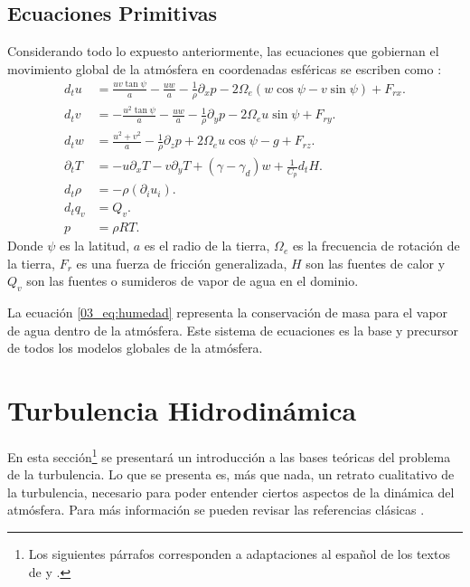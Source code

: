 \subsection{Ecuaciones Primitivas}
Considerando todo lo expuesto anteriormente, las ecuaciones que gobiernan el movimiento global de la atmósfera en coordenadas esféricas se escriben como \citep{warner2010numerical}:
\begin{align}
d_t u &= \frac{uv\tan\psi}{a}-\frac{uw}{a}-\frac{1}{\rho}\partial_x p - 2\Omega_e(w\cos\psi - v\sin\psi) + F_{rx}.\\
d_t v &= -\frac{u^2\tan\psi}{a}-\frac{uw}{a}-\frac{1}{\rho}\partial_y p - 2\Omega_e u\sin\psi + F_{ry}.\\
d_t w &= \frac{u^2 + v^2}{a}-\frac{1}{\rho}\partial_z p + 2\Omega_e u\cos\psi -g + F_{rz}.\\
\partial_t T &= -u\partial_x T -v\partial_y T + (\gamma-\gamma_d)w+\frac{1}{C_p}d_t H.\\
d_t \rho &= -\rho(\partial_i u_i).\\
d_t q_v &= Q_v\label{03_eq:humedad}.\\
p &= \rho R T.
\end{align}
Donde $\psi$ es la latitud, $a$ es el radio de la tierra, $\Omega_e$ es la frecuencia de rotación de la tierra, $F_r$ es una fuerza de fricción generalizada, $H$ son las fuentes de calor y $Q_v$ son las fuentes o sumideros de vapor de agua en el dominio.

La ecuación \ref{03_eq:humedad} representa la conservación de masa para el vapor de agua dentro de la atmósfera. Este sistema de ecuaciones es la base y precursor de todos los modelos globales de la atmósfera.
\newpage


\section{Turbulencia Hidrodinámica}
En esta sección\footnote{Los siguientes párrafos corresponden a adaptaciones al español de los textos de \cite{pope2000turbulent} y \cite{9780521775380}.} se presentará un introducción a las bases teóricas del problema de la turbulencia. Lo que se presenta es, más que nada, un retrato cualitativo de la turbulencia, necesario para poder entender ciertos aspectos de la dinámica del atmósfera. Para más información se pueden revisar las referencias clásicas \citep{pope2000turbulent,davidson2013turbulence,9780521775380}.
